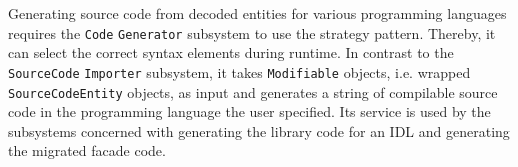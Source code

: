 Generating source code from decoded entities for various programming languages requires the \texttt{Code} \texttt{Generator} subsystem to use the strategy pattern. Thereby, it can select the correct syntax elements during runtime. In contrast to the \texttt{Source\-Code} \texttt{Importer} subsystem, it takes \texttt{Modifiable} objects, i.e. wrapped \texttt{Source\-Code\-Entity} objects, as input and generates a string of compilable source code in the programming language the user specified. Its service is used by the subsystems concerned with generating the library code for an IDL and generating the migrated facade code.

\begin{figure}[!h]
\end{figure}

